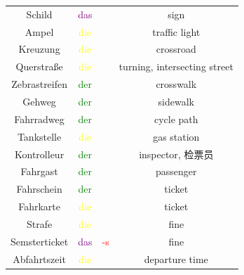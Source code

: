 \begin{center}
\begin{tabular}{|c|c|c|c|}
        \hline
        Schild         & \textcolor{purple}{das} &                                        & sign                         \\
        Ampel          & \textcolor{yellow}{die} &                                        & traffic light                \\
        Kreuzung       & \textcolor{yellow}{die} &                                        & crossroad                    \\
        Querstraße     & \textcolor{yellow}{die} &                                        & turning, intersecting street \\
        Zebrastreifen  & \textcolor{green}{der}  &                                        & crosswalk                    \\
        Gehweg         & \textcolor{green}{der}  &                                        & sidewalk                     \\
        Fahrradweg     & \textcolor{green}{der}  &                                        & cycle path                   \\
        Tankstelle     & \textcolor{yellow}{die} &                                        & gas station                  \\
        \hline
        Kontrolleur    & \textcolor{green}{der}  &                                        & inspector, 检票员               \\
        Fahrgast       & \textcolor{green}{der}  &                                        & passenger                    \\
        Fahrschein     & \textcolor{green}{der}  &                                        & ticket                       \\
        Fahrkarte      & \textcolor{yellow}{die} &                                        & ticket                       \\
        Strafe         & \textcolor{yellow}{die} &                                        & fine                         \\
        Semsterticket  & \textcolor{purple}{das} & \textcolor{red}{-s}                    & fine                         \\
        Abfahrtszeit   & \textcolor{yellow}{die} &                                        & departure time               \\
        \hline
    \end{tabular}
\end{center}

